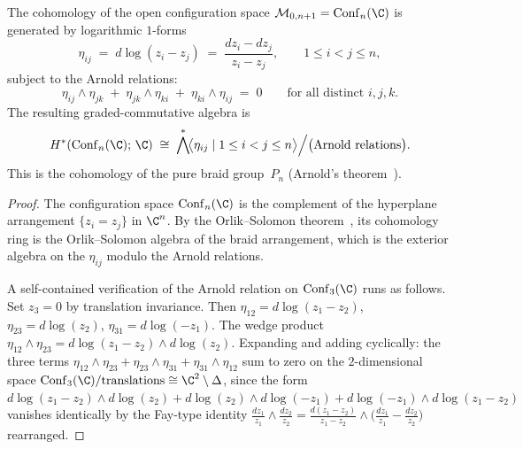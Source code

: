 \begin{proposition}
\label{prop:thqg-V-arnold-cohomology}
The cohomology of the open configuration space
$\mathcal{M}_{0,n+1} = \Conf_n(\C)$ is generated by logarithmic
$1$-forms
\begin{equation}%
\eta_{ij}
\;=\;
d\log(z_i - z_j)
\;=\;
\frac{dz_i - dz_j}{z_i - z_j},
\qquad 1 \leq i < j \leq n,
\end{equation}
subject to the Arnold relations:
\begin{equation}%
\eta_{ij} \wedge \eta_{jk}
\;+\;
\eta_{jk} \wedge \eta_{ki}
\;+\;
\eta_{ki} \wedge \eta_{ij}
\;=\; 0
\qquad
\text{for all distinct } i,j,k.
\end{equation}
The resulting graded-commutative algebra is
\begin{equation}%
H^*(\Conf_n(\C);\,\C)
\;\cong\;
\bigwedge^*\!\bigl\langle \eta_{ij} \mid 1 \leq i < j \leq n
\bigr\rangle
\Big/
\bigl(\text{Arnold relations}\bigr).
\end{equation}
This is the cohomology of the pure braid group~$P_n$
\textup{(}Arnold's theorem~\cite{Arnold69}\textup{)}.
\end{proposition}

\begin{proof}
The configuration space $\Conf_n(\C)$ is the complement of the
hyperplane arrangement $\{z_i = z_j\}$ in $\C^n$. By the
Orlik--Solomon theorem~\cite{OrlSol80}, its cohomology ring is
the Orlik--Solomon algebra of the braid arrangement, which is the
exterior algebra on the $\eta_{ij}$ modulo the Arnold relations.

A self-contained verification of the Arnold relation on
$\Conf_3(\C)$ runs as follows. Set $z_3 = 0$ by translation invariance. Then
$\eta_{12} = d\log(z_1 - z_2)$,
$\eta_{23} = d\log(z_2)$,
$\eta_{31} = d\log(-z_1)$.
The wedge product
$\eta_{12} \wedge \eta_{23}
= d\log(z_1 - z_2) \wedge d\log(z_2)$.
Expanding and adding cyclically: the three terms
$\eta_{12} \wedge \eta_{23}
+ \eta_{23} \wedge \eta_{31}
+ \eta_{31} \wedge \eta_{12}$
sum to zero on the $2$-dimensional space
$\Conf_3(\C)/\mathrm{translations} \cong \C^2 \setminus \Delta$,
since the form $d\log(z_1 - z_2) \wedge d\log(z_2)
+ d\log(z_2) \wedge d\log(-z_1)
+ d\log(-z_1) \wedge d\log(z_1 - z_2)$
vanishes identically by the Fay-type identity
$\frac{dz_1}{z_1} \wedge \frac{dz_2}{z_2}
= \frac{d(z_1-z_2)}{z_1-z_2} \wedge
\bigl(\frac{dz_1}{z_1} - \frac{dz_2}{z_2}\bigr)$
rearranged.
\end{proof}

